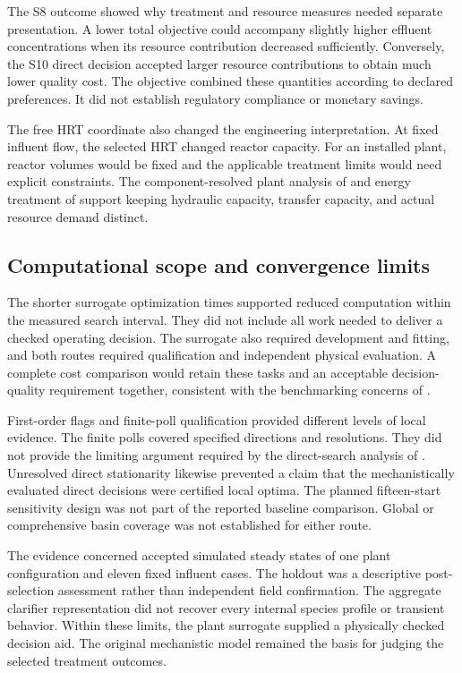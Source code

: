 The S8 outcome showed why treatment and resource measures needed separate presentation. A lower total objective could accompany slightly higher effluent concentrations when its resource contribution decreased sufficiently. Conversely, the S10 direct decision accepted larger resource contributions to obtain much lower quality cost. The objective combined these quantities according to declared preferences. It did not establish regulatory compliance or monetary savings.

The free HRT coordinate also changed the engineering interpretation. At fixed influent flow, the selected HRT changed reactor capacity. For an installed plant, reactor volumes would be fixed and the applicable treatment limits would need explicit constraints. The component-resolved plant analysis of \citet{Zhang2026} and energy treatment of \citet{Miederer2025} support keeping hydraulic capacity, transfer capacity, and actual resource demand distinct.

\subsection{Computational scope and convergence limits}

The shorter surrogate optimization times supported reduced computation within the measured search interval. They did not include all work needed to deliver a checked operating decision. The surrogate also required development and fitting, and both routes required qualification and independent physical evaluation. A complete cost comparison would retain these tasks and an acceptable decision-quality requirement together, consistent with the benchmarking concerns of \citet{Bliek2023}.

First-order flags and finite-poll qualification provided different levels of local evidence. The finite polls covered specified directions and resolutions. They did not provide the limiting argument required by the direct-search analysis of \citet{AudetDennis2006}. Unresolved direct stationarity likewise prevented a claim that the mechanistically evaluated direct decisions were certified local optima. The planned fifteen-start sensitivity design was not part of the reported baseline comparison. Global or comprehensive basin coverage was not established for either route.

The evidence concerned accepted simulated steady states of one plant configuration and eleven fixed influent cases. The holdout was a descriptive post-selection assessment rather than independent field confirmation. The aggregate clarifier representation did not recover every internal species profile or transient behavior. Within these limits, the plant surrogate supplied a physically checked decision aid. The original mechanistic model remained the basis for judging the selected treatment outcomes.
